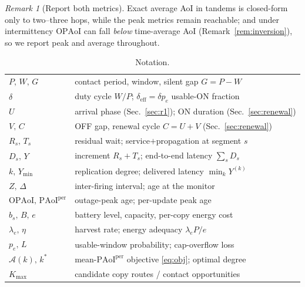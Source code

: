 \documentclass[twocolumn,3p,times,procedia]{elsarticle}
\theoremstyle{plain}
\theoremstyle{remark}
\newtheorem{remark}{Remark}
\newcommand{\AoI}{\Delta}
\newcommand{\OPAoI}{\mathrm{OPAoI}}
\newcommand{\PAoIper}{\mathrm{PAoI}^{\mathrm{per}}}
\newcommand{\Ymin}{Y_{\min}}
\newcommand{\dutyeff}{\delta_{\mathrm{eff}}}
\newcommand{\peff}{p_e}
\newcommand{\kstar}{k^{\ast}}
\begin{document}
\begin{remark}[Report both metrics]
Exact average AoI in tandems is closed-form only to two--three hops,
while the peak metrics remain reachable; and under intermittency
$\OPAoI$ can fall \emph{below} time-average AoI
(Remark~\ref{rem:inversion}), so we report peak and average
throughout.
\end{remark}

\begin{table}[t]
\caption{Notation.}
\label{tab:notation}
\centering
\renewcommand{\arraystretch}{1.12}
\setlength{\tabcolsep}{4pt}
\footnotesize
\begin{tabular}{ll}
\hline
$P,\,W,\,G$ & contact period, window, silent gap $G=P-W$ \\
$\delta$ & duty cycle $W/P$;\; $\dutyeff=\delta\peff$ usable-ON fraction \\
$U$ & arrival phase (Sec.~\ref{sec:r1}); ON duration (Sec.~\ref{sec:renewal}) \\
$V,\,C$ & OFF gap, renewal cycle $C=U+V$ (Sec.~\ref{sec:renewal}) \\
$R_s,\,T_s$ & residual wait; service$+$propagation at segment $s$ \\
$D_s,\,Y$ & increment $R_s{+}T_s$; end-to-end latency $\sum_s D_s$ \\
$k,\,\Ymin$ & replication degree; delivered latency $\min_k Y^{(k)}$ \\
$Z,\,\AoI$ & inter-firing interval; age at the monitor \\
$\OPAoI,\,\PAoIper$ & outage-peak age; per-update peak age \\
$b_s,\,B,\,e$ & battery level, capacity, per-copy energy cost \\
$\lambda_e,\,\eta$ & harvest rate; energy adequacy $\lambda_e P/e$ \\
$\peff,\,L$ & usable-window probability; cap-overflow loss \\
$\mathcal{A}(k),\,\kstar$ & mean-$\PAoIper$ objective \eqref{eq:obj}; optimal degree \\
$K_{\max}$ & candidate copy routes / contact opportunities \\
\hline
\end{tabular}
\end{table}
\end{document}
